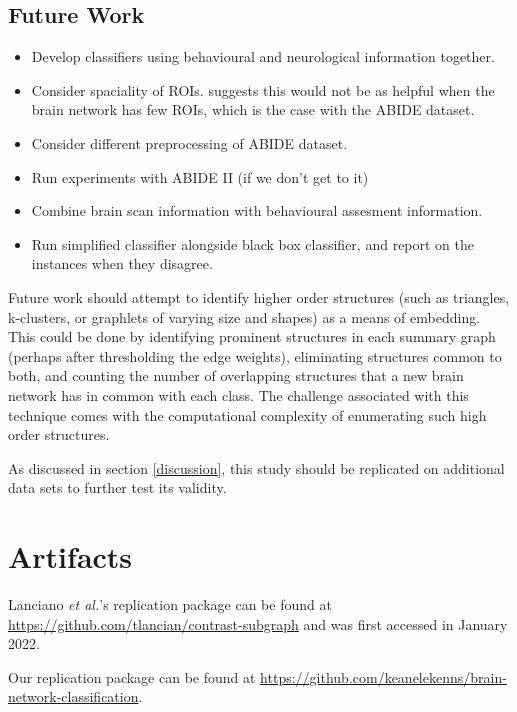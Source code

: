 \documentclass[sigconf]{acmart}
\begin{document}
\subsection{Future Work}
\begin{itemize}
    \item Develop classifiers using behavioural and neurological information together.
    \item Consider spaciality of ROIs. \cite{relion2019} suggests this would not be as helpful when the brain network has few ROIs, which is the case with the ABIDE dataset.
    \item Consider different preprocessing of ABIDE dataset.
    \item Run experiments with ABIDE II (if we don't get to it)
    \item Combine brain scan information with behavioural assesment information.
    \item Run simplified classifier alongside black box classifier, and report on the instances when they disagree.
\end{itemize}

Future work should attempt to identify higher order structures (such as triangles, k-clusters, or graphlets of varying size and shapes) as a means of embedding.
This could be done by identifying prominent structures in each summary graph (perhaps after thresholding the edge weights), eliminating structures common to both, and counting the number of overlapping structures that a new brain network has in common with each class.
The challenge associated with this technique comes with the computational complexity of enumerating such high order structures.

As discussed in section \ref{discussion}, this study should be replicated on additional data sets to further test its validity.


\appendix

\section{Artifacts} \label{artifacts}

Lanciano \emph{et al.}'s replication package can be found at \url{https://github.com/tlancian/contrast-subgraph} and was first accessed in January 2022.

Our replication package can be found at \url{https://github.com/keanelekenns/brain-network-classification}.



\end{document}
